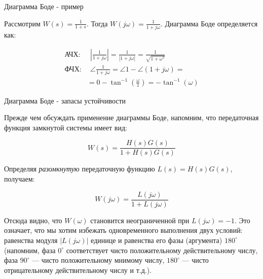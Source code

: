 \documentclass{beamer}
\newcommand{\degree}{^{\circ}}
\begin{document}
\begin{frame}{Диаграмма Боде - пример}
	\begin{flushleft}
		
		Рассмотрим $W(s) = \frac{1}{1 + s}$. Тогда $W(j \omega) = \frac{1}{1 + j \omega}$. Диаграмма Боде определяется как:
		
		\begin{align}
			\text{АЧХ:}& \ \ 
			\left|  \frac{1}{1 + j \omega} \right| =  \frac{1}{|1 + j \omega|} = 
			\frac{1}{\sqrt{1 + \omega^2}}
			\\
			\text{ФЧХ:}& \ \ 
			\angle \frac{1}{1 + j \omega} = \angle 1 - \angle (1 + j \omega) = \\ &= 0 - \tan^{-1} \left( \frac{\omega}{1} \right) = -\tan^{-1}(\omega)
		\end{align}
		
	\end{flushleft}
\end{frame}

\begin{frame}{Диаграмма Боде - запасы устойчивости}
	\begin{flushleft}
		
		{\small
		Прежде чем обсуждать применение диаграммы Боде, напомним, что передаточная функция замкнутой системы имеет вид:
		
		\begin{equation}
			W(s) = \frac{H(s)G(s)}{1 + H(s)G(s)}
		\end{equation}
		
		Определяя \emph{разомкнутую} передаточную функцию $L(s) = H(s)G(s)$, получаем:
		
		\begin{equation}
			W(j\omega) = \frac{L(j \omega)}{1 + L(j \omega)}
		\end{equation}
		
		Отсюда видно, что $W(\omega)$ становится неограниченной при $L(j \omega) = -1$. Это означает, что мы хотим избежать одновременного выполнения двух условий: равенства модуля $|L(j \omega)|$ единице и равенства его фазы (аргумента) $180\degree$ (напомним, фаза $0\degree$ соответствует чисто положительному действительному числу, фаза $90\degree$ — чисто положительному мнимому числу, $180\degree$ — чисто отрицательному действительному числу и т.д.).
		
		}
		
	\end{flushleft}
\end{frame}
\end{document}
